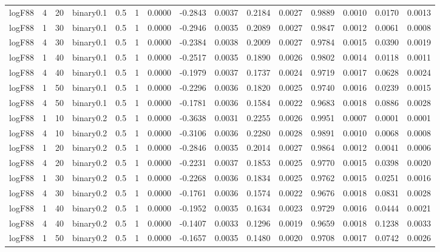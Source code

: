 \begin{longtable}{rrrrrrrrrrrrrrr}
  logF88 & 4 & 20 & binary0.1 & 0.5 & 1 & 0.0000 & -0.2843 & 0.0037 & 0.2184 & 0.0027 & 0.9889 & 0.0010 & 0.0170 & 0.0013 \\ 
  logF88 & 1 & 30 & binary0.1 & 0.5 & 1 & 0.0000 & -0.2946 & 0.0035 & 0.2089 & 0.0027 & 0.9847 & 0.0012 & 0.0061 & 0.0008 \\ 
  logF88 & 4 & 30 & binary0.1 & 0.5 & 1 & 0.0000 & -0.2384 & 0.0038 & 0.2009 & 0.0027 & 0.9784 & 0.0015 & 0.0390 & 0.0019 \\ 
  logF88 & 1 & 40 & binary0.1 & 0.5 & 1 & 0.0000 & -0.2517 & 0.0035 & 0.1890 & 0.0026 & 0.9802 & 0.0014 & 0.0118 & 0.0011 \\ 
  logF88 & 4 & 40 & binary0.1 & 0.5 & 1 & 0.0000 & -0.1979 & 0.0037 & 0.1737 & 0.0024 & 0.9719 & 0.0017 & 0.0628 & 0.0024 \\ 
  logF88 & 1 & 50 & binary0.1 & 0.5 & 1 & 0.0000 & -0.2296 & 0.0036 & 0.1820 & 0.0025 & 0.9740 & 0.0016 & 0.0239 & 0.0015 \\ 
  logF88 & 4 & 50 & binary0.1 & 0.5 & 1 & 0.0000 & -0.1781 & 0.0036 & 0.1584 & 0.0022 & 0.9683 & 0.0018 & 0.0886 & 0.0028 \\ 
  logF88 & 1 & 10 & binary0.2 & 0.5 & 1 & 0.0000 & -0.3638 & 0.0031 & 0.2255 & 0.0026 & 0.9951 & 0.0007 & 0.0001 & 0.0001 \\ 
  logF88 & 4 & 10 & binary0.2 & 0.5 & 1 & 0.0000 & -0.3106 & 0.0036 & 0.2280 & 0.0028 & 0.9891 & 0.0010 & 0.0068 & 0.0008 \\ 
  logF88 & 1 & 20 & binary0.2 & 0.5 & 1 & 0.0000 & -0.2846 & 0.0035 & 0.2014 & 0.0027 & 0.9864 & 0.0012 & 0.0041 & 0.0006 \\ 
  logF88 & 4 & 20 & binary0.2 & 0.5 & 1 & 0.0000 & -0.2231 & 0.0037 & 0.1853 & 0.0025 & 0.9770 & 0.0015 & 0.0398 & 0.0020 \\ 
  logF88 & 1 & 30 & binary0.2 & 0.5 & 1 & 0.0000 & -0.2268 & 0.0036 & 0.1834 & 0.0025 & 0.9762 & 0.0015 & 0.0251 & 0.0016 \\ 
  logF88 & 4 & 30 & binary0.2 & 0.5 & 1 & 0.0000 & -0.1761 & 0.0036 & 0.1574 & 0.0022 & 0.9676 & 0.0018 & 0.0831 & 0.0028 \\ 
  logF88 & 1 & 40 & binary0.2 & 0.5 & 1 & 0.0000 & -0.1952 & 0.0035 & 0.1634 & 0.0023 & 0.9729 & 0.0016 & 0.0444 & 0.0021 \\ 
  logF88 & 4 & 40 & binary0.2 & 0.5 & 1 & 0.0000 & -0.1407 & 0.0033 & 0.1296 & 0.0019 & 0.9659 & 0.0018 & 0.1238 & 0.0033 \\ 
  logF88 & 1 & 50 & binary0.2 & 0.5 & 1 & 0.0000 & -0.1657 & 0.0035 & 0.1480 & 0.0020 & 0.9708 & 0.0017 & 0.0742 & 0.0026 \\ 

\end{longtable}
